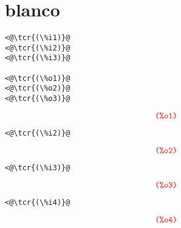 \documentclass[../Maxima_Workbook.tex]{subfiles}
\begin{document}
	
\chapter{blanco}

\lz \begin{small}
\color{blue} \leqn
\begin{lstlisting}
<@\tcr{(\%i1)}@   
<@\tcr{(\%i2)}@   
<@\tcr{(\%i3)}@   

<@\tcr{(\%o1)}@			        
<@\tcr{(\%o2)}@			        
<@\tcr{(\%o3)}@			        
\end{lstlisting}
\vspace{-4mm} \[\tag*{\tcr{\ttfamily (\%o1)}}  \]
\vspace{-5mm} \begin{lstlisting}
<@\tcr{(\%i2)}@   
\end{lstlisting}
\vspace{-4mm} \[\tag*{\tcr{\ttfamily (\%o2)}}  \]
\vspace{-5mm} \begin{lstlisting}
<@\tcr{(\%i3)}@   
\end{lstlisting}
\vspace{-4mm} \[\tag*{\tcr{\ttfamily (\%o3)}}  \]
\vspace{-5mm} \begin{lstlisting}
<@\tcr{(\%i4)}@   
\end{lstlisting}
\vspace{-4mm} \[\tag*{\tcr{\ttfamily (\%o4)}}  \]
\color{black} \reqn
\end{small} \vspace{-4mm}
\end{document}
